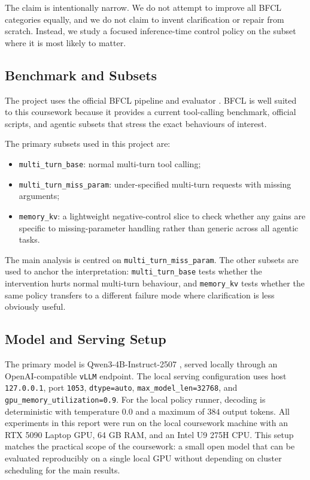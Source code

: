 \documentclass[10pt,twocolumn]{article}
\newcommand{\PrimaryModel}{Qwen3-4B-Instruct-2507}
\begin{document}
The claim is intentionally narrow. We do not attempt to improve all BFCL categories equally, and we do not claim to invent clarification or repair from scratch. Instead, we study a focused inference-time control policy on the subset where it is most likely to matter.

\subsection{Benchmark and Subsets}
The project uses the official BFCL pipeline and evaluator \citep{patil2025bfcl}. BFCL is well suited to this coursework because it provides a current tool-calling benchmark, official scripts, and agentic subsets that stress the exact behaviours of interest.

The primary subsets used in this project are:
\begin{itemize}
    \item \texttt{multi\_turn\_base}: normal multi-turn tool calling;
    \item \texttt{multi\_turn\_miss\_param}: under-specified multi-turn requests with missing arguments;
    \item \texttt{memory\_kv}: a lightweight negative-control slice to check whether any gains are specific to missing-parameter handling rather than generic across all agentic tasks.
\end{itemize}

The main analysis is centred on \texttt{multi\_turn\_miss\_param}. The other subsets are used to anchor the interpretation: \texttt{multi\_turn\_base} tests whether the intervention hurts normal multi-turn behaviour, and \texttt{memory\_kv} tests whether the same policy transfers to a different failure mode where clarification is less obviously useful.

\subsection{Model and Serving Setup}
The primary model is \PrimaryModel{} \citep{yang2025qwen3,qwen2025modelcard}, served locally through an OpenAI-compatible \texttt{vLLM} endpoint. The local serving configuration uses host \texttt{127.0.0.1}, port \texttt{1053}, \texttt{dtype=auto}, \texttt{max\_model\_len=32768}, and \texttt{gpu\_memory\_utilization=0.9}. For the local policy runner, decoding is deterministic with temperature $0.0$ and a maximum of $384$ output tokens. All experiments in this report were run on the local coursework machine with an RTX 5090 Laptop GPU, 64 GB RAM, and an Intel U9 275H CPU. This setup matches the practical scope of the coursework: a small open model that can be evaluated reproducibly on a single local GPU without depending on cluster scheduling for the main results.
\end{document}
